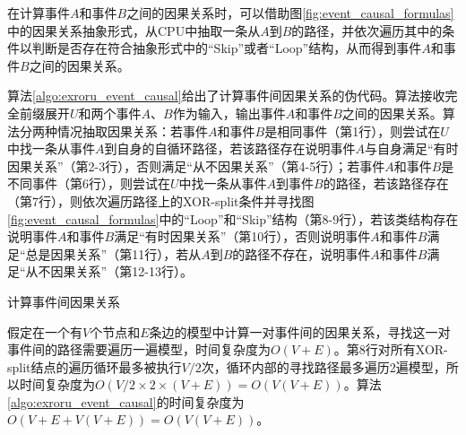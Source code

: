 在计算事件$A$和事件$B$之间的因果关系时，可以借助图\ref{fig:event_causal_formulas}中的因果关系抽象形式，从CPU中抽取一条从$A$到$B$的路径，并依次遍历其中的条件以判断是否存在符合抽象形式中的“Skip”或者“Loop”结构，从而得到事件$A$和事件$B$之间的因果关系。

算法\ref{algo:exroru_event_causal}给出了计算事件间因果关系的伪代码。算法接收完全前缀展开$U$和两个事件$A$、$B$作为输入，输出事件$A$和事件$B$之间的因果关系。算法分两种情况抽取因果关系：若事件$A$和事件$B$是相同事件（第1行），则尝试在$U$中找一条从事件$A$到自身的自循环路径，若该路径存在说明事件$A$与自身满足“有时因果关系”（第2-3行），否则满足“从不因果关系”（第4-5行）；若事件$A$和事件$B$是不同事件（第6行），则尝试在$U$中找一条从事件$A$到事件$B$的路径，若该路径存在（第7行），则依次遍历路径上的XOR-split条件并寻找图\ref{fig:event_causal_formulas}中的“Loop”和“Skip”结构（第8-9行），若该类结构存在说明事件$A$和事件$B$满足“有时因果关系”（第10行），否则说明事件$A$和事件$B$满足“总是因果关系”（第11行），若从$A$到$B$的路径不存在，说明事件$A$和事件$B$满足“从不因果关系”（第12-13行）。

\begin{algorithm}[htbp]
  \LinesNumbered
  \caption{计算事件间因果关系}
  \label{algo:exroru_event_causal}
   {
  	 {
  	} 
  } 
\end{algorithm}


假定在一个有$V$个节点和$E$条边的模型中计算一对事件间的因果关系，寻找这一对事件间的路径需要遍历一遍模型，时间复杂度为$O(V+E)$。第8行对所有XOR-split结点的遍历循环最多被执行$V/2$次，循环内部的寻找路径最多遍历2遍模型，所以时间复杂度为$O(V/2\times 2\times(V+E))=O(V(V+E))$。算法\ref{algo:exroru_event_causal}的时间复杂度为$O(V+E+V(V+E))=O(V(V+E))$。

